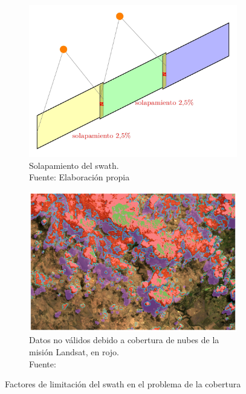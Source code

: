 \begin{figure}[H]
    \centering
    \begin{subfigure}[t]{0.45\textwidth}
        \centering
        \includegraphics[width=\linewidth]{4.Payload/TFG_Tikz-1.jpg}
        \caption{Solapamiento del swath. \\ Fuente: Elaboración propia}
        \label{fig:img3}
    \end{subfigure}
    \hspace{0.05\textwidth}
    \begin{subfigure}[t]{0.45\textwidth}
        \centering
        \includegraphics[width=\linewidth]{4.Payload/cloudcov.png}
        \caption{Datos no válidos debido a cobertura de nubes de la misión Landsat, en rojo. \\ Fuente: \cite{osullivan2023removing}}
        \label{fig:img4}
    \end{subfigure}
    \caption{Factores de limitación del swath en el problema de la cobertura}
\end{figure}


